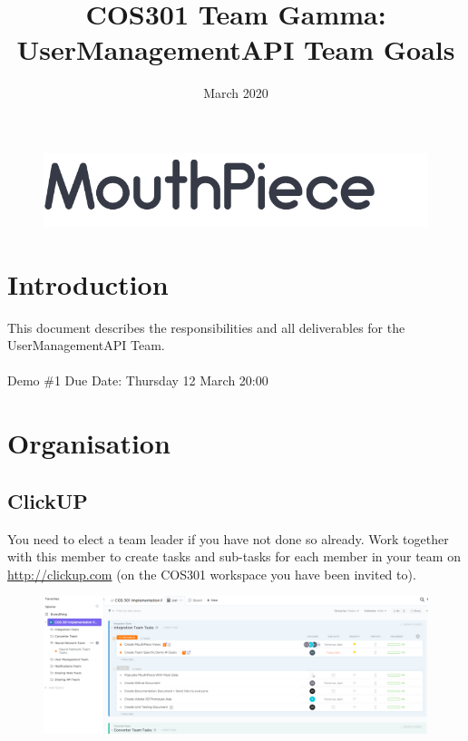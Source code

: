 \documentclass{article}
\begin{document}
\title{COS301 Team Gamma: UserManagementAPI Team Goals}
\begin{figure}
    \centering
    \includegraphics[width=\textwidth]{logo.png}
\end{figure}
\date{March 2020}

\maketitle

\section{Introduction}
This document describes the responsibilities and all deliverables for the \\UserManagementAPI Team.
\\ \\
Demo \#1 Due Date: Thursday 12 March 20:00
\newpage

\section{Organisation}
\subsection{ClickUP}
You need to elect a team leader if you have not done so already. Work together with this member to create tasks and sub-tasks for each member in your team on \url{http://clickup.com} (on the COS301 workspace you have been invited to). \\

\begin{figure}[h]
    \centering
    \includegraphics[width=\textwidth]{clickup.png}
\end{figure}
\end{document}
